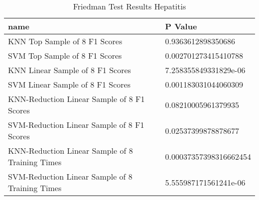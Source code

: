 \begin{table}[!htbp]
\centering
\caption{Friedman Test Results Hepatitis}
\label{tab:friedman_test_results_hepatitis}
\begin{tabular}{ll}
\toprule
name & P Value \\
\midrule
KNN Top Sample of 8 F1 Scores & 0.9363612898350686 \\
SVM Top Sample of 8 F1 Scores & 0.002701273415410788 \\
KNN Linear Sample of 8 F1 Scores & 7.258355849331829e-06 \\
SVM Linear Sample of 8 F1 Scores & 0.001183031044060309 \\
KNN-Reduction Linear Sample of 8 F1 Scores & 0.08210005961379935 \\
SVM-Reduction Linear Sample of 8 F1 Scores & 0.02537399878878677 \\
KNN-Reduction Linear Sample of 8 Training Times & 0.00037357398316662454 \\
SVM-Reduction Linear Sample of 8 Training Times & 5.555987171561241e-06 \\
\bottomrule
\end{tabular}
\end{table}
